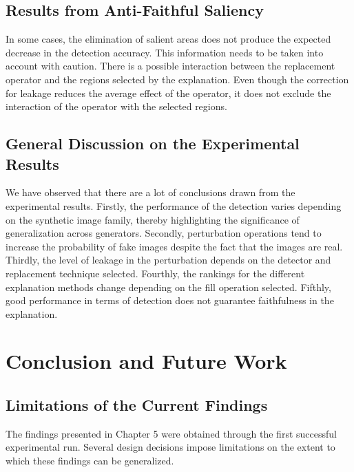 \section{Results from Anti-Faithful Saliency}

In some cases, the elimination of salient areas does not produce the
expected decrease in the detection accuracy. This information needs to
be taken into account with caution. There is a possible interaction
between the replacement operator and the regions selected by the
explanation.
Even though the correction for leakage reduces the average effect of the
operator, it does not exclude the interaction of the operator with the
selected regions.

\section{General Discussion on the Experimental Results}

We have observed that there are a lot of conclusions drawn from the
experimental results. Firstly, the performance of the detection varies
depending on the synthetic image family, thereby highlighting the
significance of generalization across generators. Secondly, perturbation
operations tend to increase the probability of fake images despite the
fact that the images are real. Thirdly, the level of leakage in the
perturbation depends on the detector and replacement technique selected.
Fourthly, the rankings for the different explanation methods change
depending on the fill operation selected. Fifthly, good performance in
terms of detection does not guarantee faithfulness in the explanation.



\chapter{Conclusion and Future Work}

\section{Limitations of the Current Findings}

The findings presented in Chapter 5 were obtained through the first
successful experimental run. Several design decisions impose
limitations on the extent to which these findings can be generalized.

